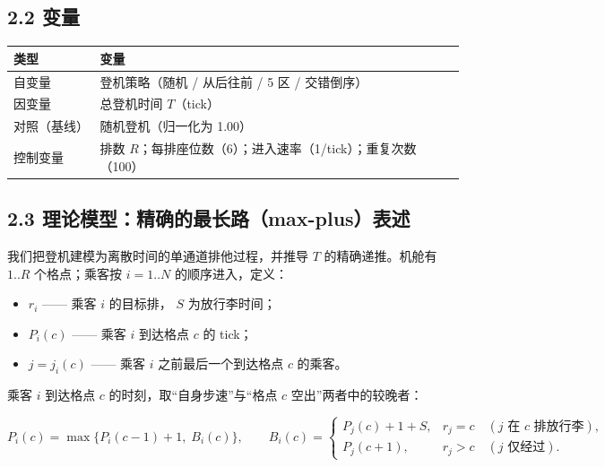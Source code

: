 \documentclass[
  11pt,
  UTF8,
  fontset=windows]{ctexart}
\newcounter{none} %
\providecommand{\tightlist}{%
  \setlength{\itemsep}{0pt}\setlength{\parskip}{0pt}}
\begin{document}
\subsection{2.2 变量}\label{ux53d8ux91cf}

{\def\LTcaptype{none} %
\begin{longtable}[]{@{}
  >{\raggedright\arraybackslash}p{}
  >{\raggedright\arraybackslash}p{}@{}}
\toprule\noalign{}
\begin{minipage}[b]{\linewidth}\raggedright
类型
\end{minipage} & \begin{minipage}[b]{\linewidth}\raggedright
变量
\end{minipage} \\
\midrule\noalign{}
\endhead
\bottomrule\noalign{}
\endlastfoot
自变量 & 登机策略（随机 / 从后往前 / 5 区 / 交错倒序） \\
因变量 & 总登机时间 \(T\)（tick） \\
对照（基线） & 随机登机（归一化为 1.00） \\
控制变量 & 排数
\(R\)；每排座位数（6）；进入速率（1/tick）；重复次数（100） \\
\end{longtable}
}

\subsection{2.3
理论模型：精确的最长路（max-plus）表述}\label{ux7406ux8bbaux6a21ux578bux7cbeux786eux7684ux6700ux957fux8defmax-plusux8868ux8ff0}

我们把登机建模为离散时间的单通道排他过程，并推导 \(T\)
的精确递推。机舱有 \(1..R\) 个格点；乘客按 \(i=1..N\) 的顺序进入，定义：

\begin{itemize}
\tightlist
\item
  \(r_i\) ------ 乘客 \(i\) 的目标排， \(S\) 为放行李时间；
\item
  \(P_i(c)\) ------ 乘客 \(i\) 到达格点 \(c\) 的 tick；
\item
  \(j=j_i(c)\) ------ 乘客 \(i\) 之前最后一个到达格点 \(c\) 的乘客。
\end{itemize}

乘客 \(i\) 到达格点 \(c\) 的时刻，取``自身步速''与``格点 \(c\)
空出''两者中的较晚者：

\[P_i(c)=\max\{P_i(c-1)+1,\;B_i(c)\},\qquad
B_i(c)=\begin{cases}P_j(c)+1+S, & r_j=c\quad(j\text{ 在 }c\text{ 排放行李}),\\[2pt] P_j(c+1), & r_j>c\quad(j\text{ 仅经过}).\end{cases}\]
\end{document}
